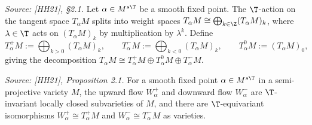 \begin{definition}
  \label{def:weight_decomp}
  \textit{Source: [HH21], §2.1.}
  Let \(\alpha \in M^{s\T}\) be a smooth fixed point.  The \(\T\)-action on the tangent space
  \(T_\alpha M\) splits into weight spaces \(T_\alpha M \cong \bigoplus_{k \in \Z} (T_\alpha M)_k\),
  where \(\lambda \in \T\) acts on \((T_\alpha M)_k\) by multiplication by \(\lambda^k\).
  Define
  \[
    T^+_\alpha M := \bigoplus_{k > 0} (T_\alpha M)_k, \qquad
    T^-_\alpha M := \bigoplus_{k < 0} (T_\alpha M)_k, \qquad
    T^0_\alpha M := (T_\alpha M)_0,
  \]
  giving the decomposition \(T_\alpha M \cong T^+_\alpha M \oplus T^0_\alpha M \oplus T^-_\alpha M\).
\end{definition}

\begin{proposition}
  \label{prop:BB_theory}
  \textit{Source: [HH21], Proposition 2.1.}
  For a smooth fixed point \(\alpha \in M^{s\T}\) in a semi-projective variety \(M\), the upward
  flow \(W^+_\alpha\) and downward flow \(W^-_\alpha\) are \(\T\)-invariant locally closed
  subvarieties of \(M\), and there are \(\T\)-equivariant isomorphisms
  \(W^+_\alpha \cong T^+_\alpha M\) and \(W^-_\alpha \cong T^-_\alpha M\) as varieties.
\end{proposition}

